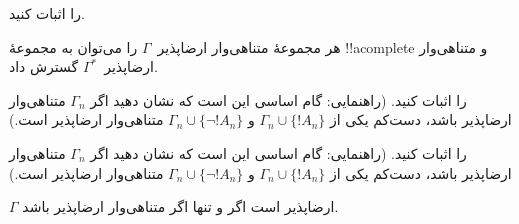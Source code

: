 \documentclass[../../../include/open-logic-section]{subfiles}
\begin{document}

\begin{prob}
 را اثبات کنید.
\end{prob}
\tagendprob

\begin{lem}
 هر مجموعهٔ متناهی‌وار ارضاپذیر~$\Gamma$
را می‌توان به مجموعهٔ !!a{complete} و متناهی‌وار ارضاپذیر~$\Gamma^*$
گسترش داد.
\end{lem}

\begin{prob}
 را اثبات کنید. (راهنمایی:
گام اساسی این است که نشان دهید اگر $\Gamma_n$ متناهی‌وار ارضاپذیر
باشد، دست‌کم یکی از $\Gamma_n \cup \{!A_n\}$ و
$\Gamma_n \cup \{\lnot !A_n\}$ متناهی‌وار ارضاپذیر است.)
\end{prob}
\tagendprob

\begin{prob}
 را اثبات کنید. (راهنمایی:
گام اساسی این است که نشان دهید اگر $\Gamma_n$ متناهی‌وار ارضاپذیر
باشد، دست‌کم یکی از $\Gamma_n \cup \{!A_n\}$ و
$\Gamma_n \cup \{\lnot !A_n\}$ متناهی‌وار ارضاپذیر است.)
\end{prob}
\tagendprob

\begin{thm}[فشردگی]
 $\Gamma$ ارضاپذیر است اگر و تنها اگر
متناهی‌وار ارضاپذیر باشد.
\end{thm}
\end{document}
